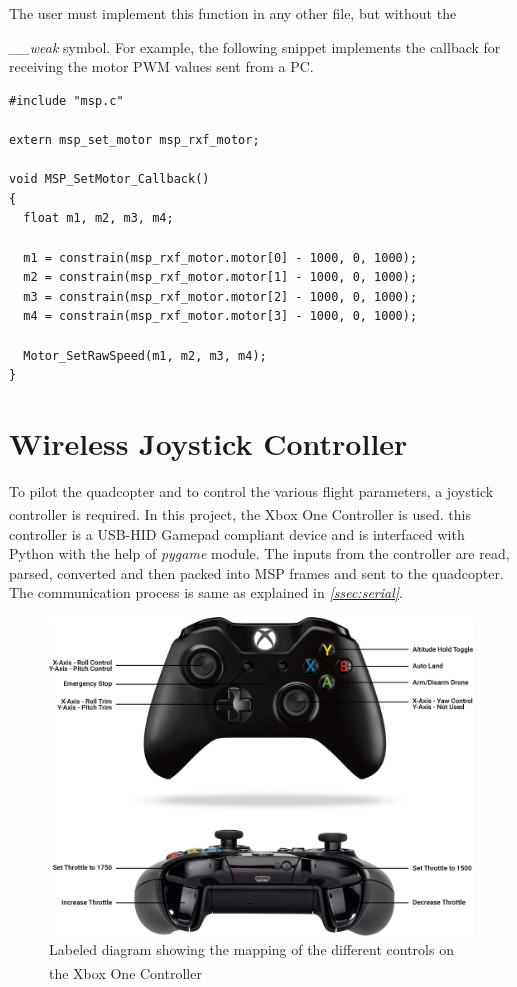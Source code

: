 \documentclass[a4paper,12pt,oneside]{book}
\begin{document}
The user must implement this function in any other file, but without the {\textit{{\_\_}weak} symbol. For example, the following snippet implements the callback for receiving the motor PWM values sent from a PC.\\

\begin{verbatim}
#include "msp.c"

extern msp_set_motor msp_rxf_motor;

void MSP_SetMotor_Callback()
{
  float m1, m2, m3, m4;

  m1 = constrain(msp_rxf_motor.motor[0] - 1000, 0, 1000);
  m2 = constrain(msp_rxf_motor.motor[1] - 1000, 0, 1000);
  m3 = constrain(msp_rxf_motor.motor[2] - 1000, 0, 1000);
  m4 = constrain(msp_rxf_motor.motor[3] - 1000, 0, 1000);

  Motor_SetRawSpeed(m1, m2, m3, m4);
}
\end{verbatim}

\clearpage

\section{Wireless Joystick Controller}
\label{sec:joystick}

To pilot the quadcopter and to control the various flight parameters, a joystick controller is required. In this project, the Xbox\textsuperscript{\textregistered} One Controller\cite{xbox} is used. this controller is a USB-HID Gamepad compliant device and is interfaced with Python with the help of \textit{pygame} module. The inputs from the controller are read, parsed, converted and then packed into MSP frames and sent to the quadcopter. The communication process is same as explained in \textit{\autoref{ssec:serial}}.\\

\begin{figure}[!htb]
\centering
\includegraphics[width=\textwidth]{images/joystick_controls}
\caption{Labeled diagram showing the mapping of the different controls on the Xbox\textsuperscript{\textregistered} One Controller\cite{xbox}}
\label{fig:joycon}
\end{figure}

}
\end{document}
